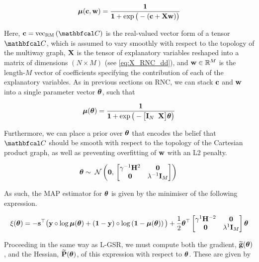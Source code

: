 \begin{equation}
    \boldsymbol{\mu}(\mathbf{c}, \mathbf{w}) = \frac{\mathbf{1}}{\mathbf{1} + \exp\big(-(\mathbf{c} + \mathbf{X} \mathbf{w}) \big)}
\end{equation}

Here, $\cc = \vecrm{\Ct}$ is the real-valued vector form of a tensor $\Ct$, which is assumed to vary smoothly with respect to the topology of the multiway graph, $\mathbf{X}$ is the tensor of explanatory variables reshaped into a matrix of dimensions $(N \times M)$ (see \cref{eq:X_RNC_dd}), and $\mathbf{w} \in \mathbb{R}^M$ is the length-$M$ vector of coefficients specifying the contribution of each of the explanatory variables. As in previous sections on RNC, we can stack $\mathbf{c}$ and $\mathbf{w}$ into a single parameter vector $\boldsymbol{\theta}$, such that 

\begin{equation}
    \label{eq:lrnc_logistic}
    \boldsymbol{\mu}(\boldsymbol{\theta}) = \frac{\mathbf{1}}{\mathbf{1} + \exp\big(-\big[\mathbf{I}_N \;\; \mathbf{X} \big] \boldsymbol{\theta} \big)}
\end{equation}

Furthermore, we can place a prior over $\boldsymbol{\theta}$ that encodes the belief that $\Ct$ should be smooth with respect to the topology of the Cartesian product graph, as well as preventing overfitting of $\mathbf{w}$ with an L2 penalty. 

\begin{equation}
    \boldsymbol{\theta} \sim \; \mathcal{N}\left(\mathbf{0}, \, \begin{bmatrix}\gamma^{-1} \mathbf{H}^2 & \mathbf{0} \\
    \mathbf{0} & \lambda^{-1} \mathbf{I}_M \end{bmatrix}\right) \;
\end{equation}

As such, the MAP estimator for $\boldsymbol{\theta}$ is given by the minimiser of the following expression. 

\begin{equation}
    \label{eq:nll_logistic_rnc}
    \xi(\boldsymbol{\theta}) = -\mathbf{s}^\top \big(\mathbf{y} \circ \log \boldsymbol{\mu}(\boldsymbol{\theta}) + \left(\mathbf{1}  - \mathbf{y}\right) \circ \log \left(\mathbf{1} - \boldsymbol{\mu}(\boldsymbol{\theta}) \right)\big) + \frac{1}{2} \boldsymbol{\theta}^\top \begin{bmatrix}\gamma^{1} \mathbf{H}^{-2} & \mathbf{0} \\
        \mathbf{0} & \lambda^{1} \mathbf{I}_M \end{bmatrix}\boldsymbol{\theta}
\end{equation}

Proceeding in the same way as L-GSR, we must compute both the gradient, $\widetilde{\mathbf{g}}(\boldsymbol{\theta})$, and the Hessian, $\widetilde{\mathbf{P}}(\boldsymbol{\theta})$, of this expression with respect to $\boldsymbol{\theta}$. These are given by 

